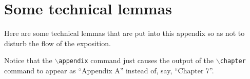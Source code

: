 \chapter{Some technical lemmas}
Here are some technical lemmas that are put into this appendix
so as not to disturb the flow of the exposition.

Notice that the 
\texttt{$\backslash$appendix}
command just causes the output of the 
\texttt{$\backslash$chapter} command to appear as ``Appendix A''
instead of, say, ``Chapter 7''.
